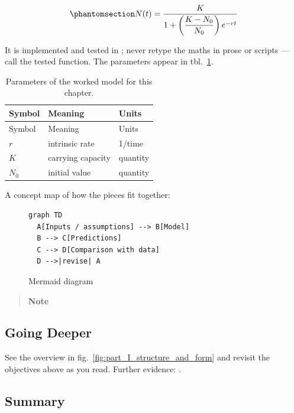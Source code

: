 \documentclass[
]{article}
\theoremstyle{plain}
\theoremstyle{definition}
\begin{document}
\begin{equation}\protect\phantomsection\label{eq:part_I_structure_and_form_model}{ N(t) = \frac{K}{1 + \left(\dfrac{K - N_0}{N_0}\right) e^{-rt}} }\end{equation}

It is implemented and tested in
; never retype the maths in
prose or scripts --- call the tested function. The parameters appear in
tbl.~\ref{tbl:part_I_structure_and_form_parameters}.

\begin{longtable}[]{@{}lll@{}}
\caption{Parameters of the worked model for this
chapter.}\label{tbl:part_I_structure_and_form_parameters}\tabularnewline
\toprule\noalign{}
Symbol & Meaning & Units \\
\midrule\noalign{}
\endfirsthead
\toprule\noalign{}
Symbol & Meaning & Units \\
\midrule\noalign{}
\endhead
\bottomrule\noalign{}
\endlastfoot
\(r\) & intrinsic rate & 1/time \\
\(K\) & carrying capacity & quantity \\
\(N_0\) & initial value & quantity \\
\end{longtable}

A concept map of how the pieces fit together:

\begin{figure}[htbp]
\centering
\begin{verbatim}
graph TD
  A[Inputs / assumptions] --> B[Model]
  B --> C[Predictions]
  C --> D[Comparison with data]
  D -->|revise| A
\end{verbatim}
\caption{Mermaid diagram}
\end{figure}

\begin{quote}
\textbf{Note}
\end{quote}

\subsection{Going Deeper}\label{going-deeper-4}

See the overview in fig.~\ref{fig:part_I_structure_and_form} and revisit
the objectives above as you read. Further evidence:
\citep{lee2021systems, garcia2022dynamics}.

\subsection{Summary}\label{summary-5}
\end{document}
